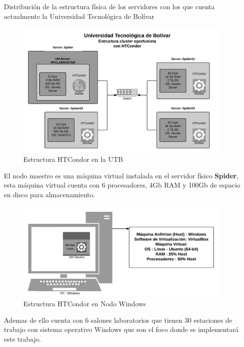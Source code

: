 Distribución de la estructura física de los servidores con los que cuenta actualmente la Universidad Tecnológica de Bolívar
\begin{figure}[h]
\centering
\includegraphics[width=0.95\textwidth]{images/spidercluster.jpeg}
\decoRule
\caption{Estructura HTCondor en la UTB}
\label{fig:UTB_Condor}
\end{figure}
\FloatBarrier

El nodo maestro es una máquina virtual instalada en el servidor físico \mbox{\textbf{Spider}}, esta máquina virtual cuenta con 6 procesadores, 4Gb RAM y 100Gb de espacio en disco para almacenamiento.

\begin{figure}[h]
\centering
\includegraphics[width=0.95\textwidth]{images/workernode.jpeg}
\decoRule
\caption{Estructura HTCondor en Nodo Windows}
\label{fig:UTB_Condor}
\end{figure}
\FloatBarrier

Ademas de ello cuenta con 6 salones laboratorios que tienen 30 estaciones de trabajo con sistema operativo Windows que son el foco donde se \mbox{implementará} este trabajo.



